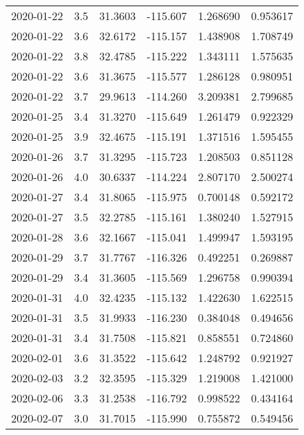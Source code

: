 \begin{tabular}{lrrrrr}
2020-01-22 &       3.5 &  31.3603 &  -115.607 &         1.268690 &         0.953617 \\
2020-01-22 &       3.6 &  32.6172 &  -115.157 &         1.438908 &         1.708749 \\
2020-01-22 &       3.8 &  32.4785 &  -115.222 &         1.343111 &         1.575635 \\
2020-01-22 &       3.6 &  31.3675 &  -115.577 &         1.286128 &         0.980951 \\
2020-01-22 &       3.7 &  29.9613 &  -114.260 &         3.209381 &         2.799685 \\
2020-01-25 &       3.4 &  31.3270 &  -115.649 &         1.261479 &         0.922329 \\
2020-01-25 &       3.9 &  32.4675 &  -115.191 &         1.371516 &         1.595455 \\
2020-01-26 &       3.7 &  31.3295 &  -115.723 &         1.208503 &         0.851128 \\
2020-01-26 &       4.0 &  30.6337 &  -114.224 &         2.807170 &         2.500274 \\
2020-01-27 &       3.4 &  31.8065 &  -115.975 &         0.700148 &         0.592172 \\
2020-01-27 &       3.5 &  32.2785 &  -115.161 &         1.380240 &         1.527915 \\
2020-01-28 &       3.6 &  32.1667 &  -115.041 &         1.499947 &         1.593195 \\
2020-01-29 &       3.7 &  31.7767 &  -116.326 &         0.492251 &         0.269887 \\
2020-01-29 &       3.4 &  31.3605 &  -115.569 &         1.296758 &         0.990394 \\
2020-01-31 &       4.0 &  32.4235 &  -115.132 &         1.422630 &         1.622515 \\
2020-01-31 &       3.5 &  31.9933 &  -116.230 &         0.384048 &         0.494656 \\
2020-01-31 &       3.4 &  31.7508 &  -115.821 &         0.858551 &         0.724860 \\
2020-02-01 &       3.6 &  31.3522 &  -115.642 &         1.248792 &         0.921927 \\
2020-02-03 &       3.2 &  32.3595 &  -115.329 &         1.219008 &         1.421000 \\
2020-02-06 &       3.3 &  31.2538 &  -116.792 &         0.998522 &         0.434164 \\
2020-02-07 &       3.0 &  31.7015 &  -115.990 &         0.755872 &         0.549456 \\

\end{tabular}
